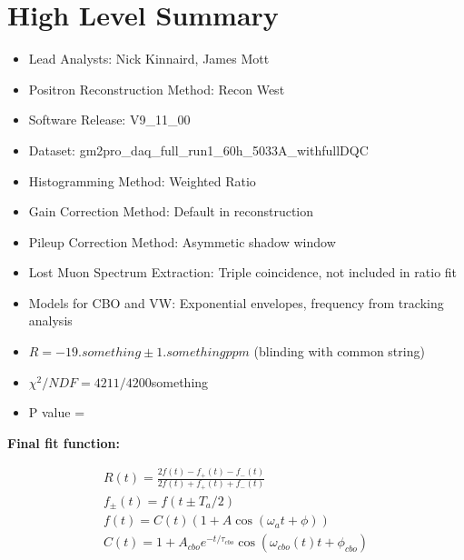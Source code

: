 \chapter*{High Level Summary}

\begin{itemize}
	\item{Lead Analysts: Nick Kinnaird, James Mott}
	\item{Positron Reconstruction Method: Recon West}
	\item{Software Release: V9\_11\_00}
	\item{Dataset: gm2pro\_daq\_full\_run1\_60h\_5033A\_withfullDQC}
	\item{Histogramming Method: Weighted Ratio}
	\item{Gain Correction Method: Default in reconstruction}
	\item{Pileup Correction Method: Asymmetic shadow window}
	\item{Lost Muon Spectrum Extraction: Triple coincidence, not included in ratio fit}
	\item{Models for CBO and VW: Exponential envelopes, frequency from tracking analysis}
	\item{$R = -19.something \pm 1.something ppm$ (blinding with common string)}
	\item{$\chi^{2}/NDF = 4211/4200$something}
	\item{P value = }
\end{itemize}

\textbf{Final fit function:}

\begin{gather*}
		R(t) = \frac{2f(t) - f_{+}(t) - f_{-}(t)}{2f(t) + f_{+}(t) + f_{-}(t)} \\[10pt]
		f_{\pm}(t) = f(t \pm T_{a}/2) \\[10pt]
		f(t) = C(t) (1 + A \cos(\omega_{a}t + \phi)) \\[10pt]
		C(t) = 1 + A_{cbo} e^{-t/\tau_{cbo}} \cos(\omega_{cbo}(t)t + \phi_{cbo})
\end{gather*}
